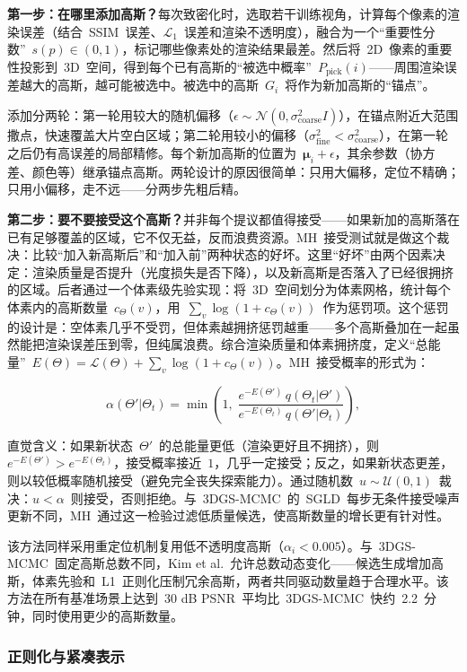 \textbf{第一步：在哪里添加高斯？}每次致密化时，选取若干训练视角，计算每个像素的渲染误差（结合~SSIM~误差、$\mathcal{L}_1$~误差和渲染不透明度），融合为一个``重要性分数''~$s(p) \in (0,1)$，标记哪些像素处的渲染结果最差。然后将~2D~像素的重要性投影到~3D~空间，得到每个已有高斯的``被选中概率''~$P_{\text{pick}}(i)$——周围渲染误差越大的高斯，越可能被选中。被选中的高斯~$G_i$~将作为新加高斯的``锚点''。

添加分两轮：第一轮用较大的随机偏移（$\epsilon \sim \mathcal{N}(0, \sigma_{\text{coarse}}^2 I)$），在锚点附近大范围撒点，快速覆盖大片空白区域；第二轮用较小的偏移（$\sigma_{\text{fine}}^2 < \sigma_{\text{coarse}}^2$），在第一轮之后仍有高误差的局部精修。每个新加高斯的位置为~$\boldsymbol{\mu}_i + \epsilon$，其余参数（协方差、颜色等）继承锚点高斯。两轮设计的原因很简单：只用大偏移，定位不精确；只用小偏移，走不远——分两步先粗后精。

\textbf{第二步：要不要接受这个高斯？}并非每个提议都值得接受——如果新加的高斯落在已有足够覆盖的区域，它不仅无益，反而浪费资源。MH~接受测试就是做这个裁决：比较``加入新高斯后''和``加入前''两种状态的好坏。这里``好坏''由两个因素决定：渲染质量是否提升（光度损失是否下降），以及新高斯是否落入了已经很拥挤的区域。后者通过一个体素级先验实现：将~3D~空间划分为体素网格，统计每个体素内的高斯数量~$c_\Theta(v)$，用~$\sum_v \log(1 + c_\Theta(v))$~作为惩罚项。这个惩罚的设计是：空体素几乎不受罚，但体素越拥挤惩罚越重——多个高斯叠加在一起虽然能把渲染误差压到零，但纯属浪费。综合渲染质量和体素拥挤度，定义``总能量''~$E(\Theta) = \mathcal{L}(\Theta) + \sum_v \log(1 + c_\Theta(v))$。MH~接受概率的形式为：

\[
\alpha(\Theta' | \Theta_t) = \min\!\left(1,\; \frac{e^{-E(\Theta')}\,q(\Theta_t | \Theta')}{e^{-E(\Theta_t)}\,q(\Theta' | \Theta_t)}\right),
\]

直觉含义：如果新状态~$\Theta'$~的总能量更低（渲染更好且不拥挤），则~$e^{-E(\Theta')} > e^{-E(\Theta_t)}$，接受概率接近~$1$，几乎一定接受；反之，如果新状态更差，则以较低概率随机接受（避免完全丧失探索能力）。通过随机数~$u \sim \mathcal{U}(0,1)$~裁决：$u < \alpha$~则接受，否则拒绝。与~3DGS-MCMC~的~SGLD~每步无条件接受噪声更新不同，MH~通过这一检验过滤低质量候选，使高斯数量的增长更有针对性。

该方法同样采用重定位机制复用低不透明度高斯（$\alpha_i < 0.005$）。与~3DGS-MCMC~固定高斯总数不同，Kim et al.~允许总数动态变化——候选生成增加高斯，体素先验和~L1~正则化压制冗余高斯，两者共同驱动数量趋于合理水平。该方法在所有基准场景上达到~30 dB PSNR~平均比~3DGS-MCMC~快约~2.2~分钟，同时使用更少的高斯数量。

\subsubsection{正则化与紧凑表示}

